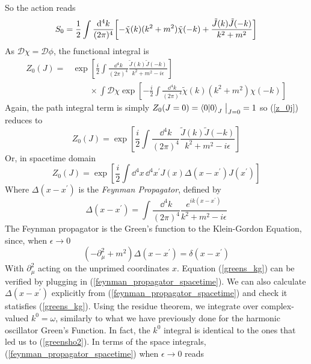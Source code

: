 So the action reads
\begin{equation}
    S_0=\frac{1}{2}\int\frac{\dd^4k}{(2\pi)^4}\qty[-\tilde{\chi}(k)(k^2+m^2)\tilde{\chi}(-k)+\frac{\tilde{J}(k)\tilde{J}(-k)}{k^2+m^2}]
\end{equation}
As $\mathcal{D}\chi=\mathcal{D}\phi$, the functional integral is
\begin{equation}
\begin{aligned}
    Z_0(J)=&\exp[\frac{i}{2}\int\frac{\dd^4k}{(2\pi)^4}\frac{\tilde{J}(k)\tilde{J}(-k)}{k^2+m^2-i\epsilon}]\\&\qquad\times\int\mathcal{D}\chi\exp[-\frac{i}{2}\int\frac{\dd^4k}{(2\pi)^4}\tilde{\chi}(k)(k^2+m^2)\chi(-k)]
\end{aligned}
\label{z_0j}
\end{equation}
Again, the path integral term is simply $Z_0(J=0)=\braket{0}_J\eval_{J=0}=1$ so (\ref{z_0j}) reduces to 
\begin{equation}
     Z_0(J)=\exp[\frac{i}{2}\int\frac{\dd^4k}{(2\pi)^4}\frac{\tilde{J}(k)\tilde{J}(-k)}{k^2+m^2-i\epsilon}]
\end{equation}
Or, in spacetime domain
\begin{equation}
    Z_0(J)=\exp[\frac{i}{2}\int\dd^4x\,\dd^4x^\prime J(x)\Delta(x-x^\prime)J(x^\prime)]
\end{equation}
Where $\Delta(x-x^\prime)$ is the \textit{Feynman Propagator}, defined by
\begin{equation}
    \Delta(x-x^\prime)=\int\frac{\dd^4k}{(2\pi)^4}\frac{e^{ik(x-x^\prime)}}{k^2+m^2-i\epsilon}
    \label{feynman_propagator_spacetime}
\end{equation}
The Feynman propagator is the Green's function to the Klein-Gordon Equation, since, when $\epsilon\to0$
\begin{equation}
    (-\partial_\mu^2+m^2)\Delta(x-x^\prime)=\delta(x-x^\prime)
    \label{greens_kg}
\end{equation}
With $\partial_\mu^2$ acting on the unprimed coordinates $x$. Equation (\ref{greens_kg}) can be verified by plugging in (\ref{feynman_propagator_spacetime}). We can also calculate $\Delta(x-x^\prime)$ explicitly from (\ref{feynman_propagator_spacetime}) and check it statisfies (\ref{greens_kg}). Using the residue theorem, we integrate over complex-valued $k^0=\omega$, similarly to what we have previously done for the harmonic oscillator Green's Function. In fact, the $k^0$ integral is identical to the ones that led us to (\ref{greensho2}). In terms of the space integrals, (\ref{feynman_propagator_spacetime}) when $\epsilon\to0$ reads
